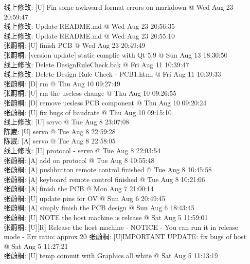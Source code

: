 \documentclass[a4paper]{paper}
\begin{document}
线上修改: [U] Fin some awkward format errors on markdown @ Wed Aug 23 20:59:47\\ 
线上修改: Update README.md @ Wed Aug 23 20:56:35\\ 
线上修改: Update README.md @ Wed Aug 23 20:55:10\\ 
张蔚桐: [U] finish PCB @ Wed Aug 23 20:49:49\\ 
张蔚桐: [version update] static complie with Qt 5.9 @ Sun Aug 13 18:30:50\\ 
线上修改: Delete DesignRuleCheck.bak @ Fri Aug 11 10:39:47\\ 
线上修改: Delete Design Rule Check - PCB1.html @ Fri Aug 11 10:39:33\\ 
张蔚桐: [D] rm @ Thu Aug 10 09:27:49\\ 
张蔚桐: [U] rm the useless change @ Thu Aug 10 09:26:55\\ 
张蔚桐: [D] remove uesless PCB component @ Thu Aug 10 09:20:24\\ 
张蔚桐: [U] fix bugs of baudrate @ Thu Aug 10 09:15:10\\ 
线上修改: [U] servo @ Tue Aug 8 23:07:08\\ 
陈崴: [U] servo @ Tue Aug 8 22:59:28\\ 
陈崴: [A] servo @ Tue Aug 8 22:58:05\\ 
线上修改: [U] protocol - servo @ Tue Aug 8 22:03:54\\ 
张蔚桐: [A] add on protocol @ Tue Aug 8 10:55:48\\ 
张蔚桐: [A] pushbutton remote control finished @ Tue Aug 8 10:45:58\\ 
张蔚桐: [A] keyboard remote control finished @ Tue Aug 8 10:21:06\\ 
张蔚桐: [A] finish the PCB @ Mon Aug 7 21:00:14\\ 
张蔚桐: [U] update pins for OV @ Sun Aug 6 20:49:45\\ 
张蔚桐: [A] simply finish the PCB design @ Sun Aug 6 18:43:45\\ 
张蔚桐: [U] NOTE the host machine is release @ Sat Aug 5 11:59:01\\ 
张蔚桐: [U][R] Release the host machine - NOTICE     - You can run it in release mode     - Err ratio: approx 20%
张蔚桐: [U]IMPORTANT UPDATE: fix bugs of host @ Sat Aug 5 11:27:21\\ 
张蔚桐: [U] temp commit with Graphics all white @ Sat Aug 5 11:13:19\\ 
\end{document}
